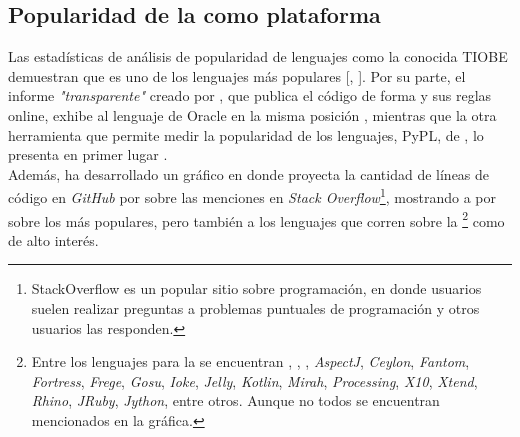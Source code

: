 \subsection{Popularidad de la \jvm como plataforma}
\label{subsec:intro:jvm_growth}

Las estadísticas de análisis de popularidad de lenguajes como la conocida TIOBE 
demuestran que \java es uno de los lenguajes más populares 
[, \citeyear{TIOBE:2014:ONLINE}]. Por su 
parte, el informe \emph{"transparente"} creado por 
, que publica el código de forma 
\opensource y sus reglas online, exhibe al lenguaje de Oracle en la misma 
posición , mientras que la otra herramienta 
\opensource que permite medir la popularidad de los lenguajes, PyPL, de
, lo presenta en primer lugar
.\\
Además,  ha desarrollado un gráfico en donde 
proyecta la cantidad de líneas de código en \emph{GitHub} por sobre las 
menciones en \emph{Stack Overflow}\footnote{
	StackOverflow es un popular sitio sobre programación, en donde usuarios
	suelen realizar preguntas a problemas puntuales de programación y otros 
	usuarios las responden.
}, mostrando a \java por sobre los más populares, pero también a los lenguajes 
que corren sobre la \jvm\footnote{
	Entre los lenguajes para la \jvm se encuentran \scala, \clojure, \groovy, 
	\emph{AspectJ}, \emph{Ceylon}, \emph{Fantom}, \emph{Fortress}, 
	\emph{Frege}, \emph{Gosu}, \emph{Ioke}, \emph{Jelly}, \emph{Kotlin}, 
	\emph{Mirah}, \emph{Processing}, \emph{X10}, \emph{Xtend}, \emph{Rhino}, 
	\emph{JRuby}, \emph{Jython}, entre otros. Aunque no todos se encuentran 
	mencionados en la gráfica.
} como de alto interés.\\